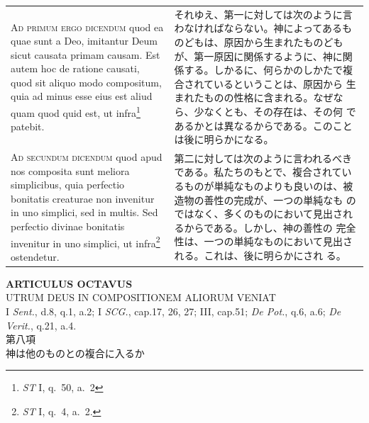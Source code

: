 \documentclass[paper=a4paper,fontsize=10pt,jafontsize=9pt,titlepage]{jlreq}
\begin{document}
\begin{longtable}{p{21em}p{21em}}
\\


{\scshape Ad primum ergo dicendum} quod ea quae sunt a Deo, imitantur Deum sicut
 causata primam causam. Est autem hoc de ratione causati, quod sit
 aliquo modo compositum, quia ad minus esse eius est aliud quam quod
 quid est, ut infra\footnote{{\itshape ST} I, q.~50, a.~2} patebit.

&

それゆえ、第一に対しては次のように言わなければならない。神によってあるも
 のどもは、原因から生まれたものどもが、第一原因に関係するように、神に関
 係する。しかるに、何らかのしかたで複合されているということは、原因から
 生まれたものの性格に含まれる。なぜなら、少なくとも、その存在は、その何
 であるかとは異なるからである。このことは後に明らかになる。

\\

{\scshape Ad secundum dicendum} quod apud nos composita sunt meliora
 simplicibus, quia perfectio bonitatis creaturae non invenitur in uno
 simplici, sed in multis. Sed perfectio divinae bonitatis invenitur in
 uno simplici, ut infra\footnote{{\itshape ST} I, q.~4, a.~2.} ostendetur.

&

第二に対しては次のように言われるべきである。私たちのもとで、複合されてい
 るものが単純なものよりも良いのは、被造物の善性の完成が、一つの単純なも
 のではなく、多くのものにおいて見出されるからである。しかし、神の善性の
 完全性は、一つの単純なものにおいて見出される。これは、後に明らかにされ
 る。

\end{longtable}

\newpage
{}
\begin{center}
 {\Large {\bfseries ARTICULUS OCTAVUS}}\\
 {\large UTRUM DEUS IN COMPOSITIONEM ALIORUM VENIAT}\\
 {\footnotesize I {\itshape Sent.}, d.8, q.1, a.2; I {\itshape SCG.},
 cap.17, 26, 27; III, cap.51; {\itshape De Pot.}, q.6, a.6; {\itshape De
 Verit.}, q.21, a.4.}\\
 {\Large 第八項\\神は他のものとの複合に入るか}
\end{center}
\end{document}
